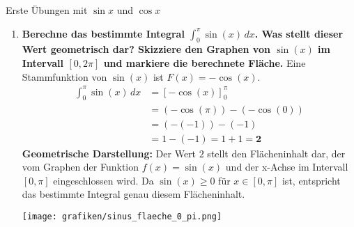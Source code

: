 \begin{loesungsumgebung}{Erste Übungen mit $\sin x$ und $\cos x$}
\begin{enumerate}[label=(\alph*)]
\begin{itemize}
        \item \textbf{$g_2(x) = \cos(x) - \frac{1}{x}$} \\
        Unter der Annahme $x>0$ (passend zum Kontext von $f_2(x)$ mit $\ln(x)$):
        \begin{align*} G_2(x) &= \int \left(\cos(x) - \frac{1}{x}\right) \,dx \\ &= \int \cos(x) \,dx - \int \frac{1}{x} \,dx \\ &= \mathbf{\sin(x) - \ln(x) + C} \quad (\text{für } x>0) \end{align*}
        (Allgemein für $x \neq 0$ wäre die Stammfunktion von $1/x$ gleich $\ln|x|$).
    \end{itemize}

    \item \textbf{Berechne das bestimmte Integral $\int_0^{\pi} \sin(x) \,dx$. Was stellt dieser Wert geometrisch dar? Skizziere den Graphen von $\sin(x)$ im Intervall $[0, 2\pi]$ und markiere die berechnete Fläche.}
    Eine Stammfunktion von $\sin(x)$ ist $F(x) = -\cos(x)$.
    \begin{align*} \int_0^{\pi} \sin(x) \,dx &= [-\cos(x)]_0^{\pi} \\ &= (-\cos(\pi)) - (-\cos(0)) \\ &= (-(-1)) - (-1) \\ &= 1 - (-1) = 1+1 = \mathbf{2} \end{align*}
    \textbf{Geometrische Darstellung:} Der Wert $2$ stellt den Flächeninhalt dar, der vom Graphen der Funktion $f(x)=\sin(x)$ und der x-Achse im Intervall $[0, \pi]$ eingeschlossen wird. Da $\sin(x) \ge 0$ für $x \in [0, \pi]$ ist, entspricht das bestimmte Integral genau diesem Flächeninhalt.
    \begin{center}
    \texttt{[image: grafiken/sinus\_flaeche\_0\_pi.png]}
    \label{fig:sinus_flaeche_0_pi}
    \end{center}


\end{enumerate}
\end{loesungsumgebung}
